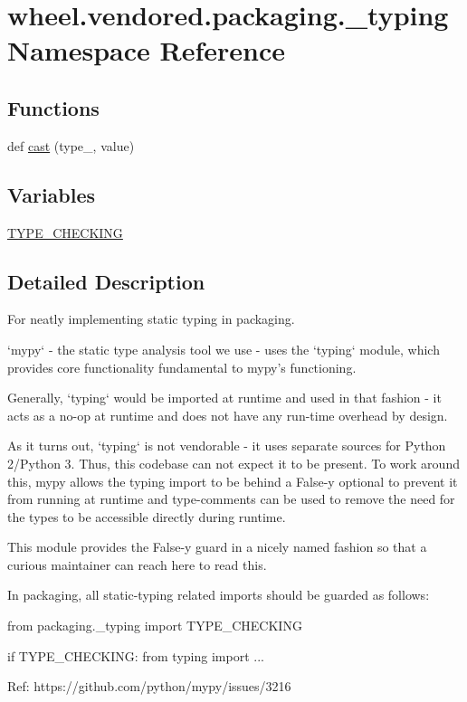 \hypertarget{namespacewheel_1_1vendored_1_1packaging_1_1__typing}{}\section{wheel.\+vendored.\+packaging.\+\_\+typing Namespace Reference}
\label{namespacewheel_1_1vendored_1_1packaging_1_1__typing}
\subsection*{Functions}
\begin{DoxyCompactItemize}
\item 
def \hyperlink{namespacewheel_1_1vendored_1_1packaging_1_1__typing_aa41d594a6b848a42dbef320c13ccc24b}{cast} (type\+\_\+, value)
\end{DoxyCompactItemize}
\subsection*{Variables}
\begin{DoxyCompactItemize}
\item 
\hyperlink{namespacewheel_1_1vendored_1_1packaging_1_1__typing_a7b3e074d4f6a8a016ffaf81efbe3a1a9}{T\+Y\+P\+E\+\_\+\+C\+H\+E\+C\+K\+I\+NG}
\end{DoxyCompactItemize}


\subsection{Detailed Description}
\begin{DoxyVerb}For neatly implementing static typing in packaging.

`mypy` - the static type analysis tool we use - uses the `typing` module, which
provides core functionality fundamental to mypy's functioning.

Generally, `typing` would be imported at runtime and used in that fashion -
it acts as a no-op at runtime and does not have any run-time overhead by
design.

As it turns out, `typing` is not vendorable - it uses separate sources for
Python 2/Python 3. Thus, this codebase can not expect it to be present.
To work around this, mypy allows the typing import to be behind a False-y
optional to prevent it from running at runtime and type-comments can be used
to remove the need for the types to be accessible directly during runtime.

This module provides the False-y guard in a nicely named fashion so that a
curious maintainer can reach here to read this.

In packaging, all static-typing related imports should be guarded as follows:

from packaging._typing import TYPE_CHECKING

if TYPE_CHECKING:
    from typing import ...

Ref: https://github.com/python/mypy/issues/3216
\end{DoxyVerb}
 

